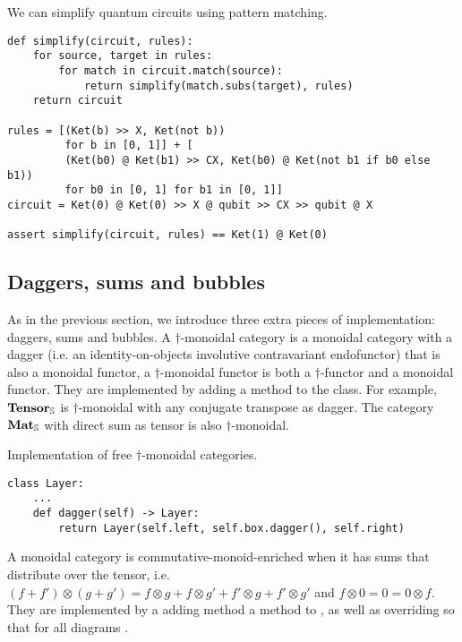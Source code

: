 \begin{example}\label{example:simplify-circuits}
We can simplify quantum circuits using pattern matching.

\begin{verbatim}
def simplify(circuit, rules):
    for source, target in rules:
        for match in circuit.match(source):
            return simplify(match.subs(target), rules)
    return circuit

rules = [(Ket(b) >> X, Ket(not b))
         for b in [0, 1]] + [
         (Ket(b0) @ Ket(b1) >> CX, Ket(b0) @ Ket(not b1 if b0 else b1))
         for b0 in [0, 1] for b1 in [0, 1]]
circuit = Ket(0) @ Ket(0) >> X @ qubit >> CX >> qubit @ X

assert simplify(circuit, rules) == Ket(1) @ Ket(0)
\end{verbatim}
\end{example}

\subsection{Daggers, sums and bubbles}\label{subsection:monoidal-daggers-sums-bubbles}

As in the previous section, we introduce three extra pieces of implementation: daggers, sums and bubbles.
A $\dagger$-monoidal category is a monoidal category with a dagger (i.e. an identity-on-objects involutive contravariant endofunctor) that is also a monoidal functor, a $\dagger$-monoidal functor is both a $\dagger$-functor and a monoidal functor.
They are implemented by adding a  method to the  class.
For example, $\mathbf{Tensor}_\S$ is $\dagger$-monoidal with any conjugate transpose as dagger.
The category $\mathbf{Mat}_\S$ with direct sum as tensor is also $\dagger$-monoidal.

\begin{python}
{\normalfont Implementation of free $\dagger$-monoidal categories.}

\begin{verbatim}
class Layer:
    ...
    def dagger(self) -> Layer:
        return Layer(self.left, self.box.dagger(), self.right)
\end{verbatim}
\end{python}

A monoidal category is commutative-monoid-enriched when it has sums that distribute over the tensor, i.e.
$(f + f') \otimes (g + g') = f \otimes g + f \otimes g' + f' \otimes g + f' \otimes g'$
and $f \otimes 0 = 0 = 0 \otimes f$.
They are implemented by a adding method a  method to , as well as overriding  so that  for all diagrams .

